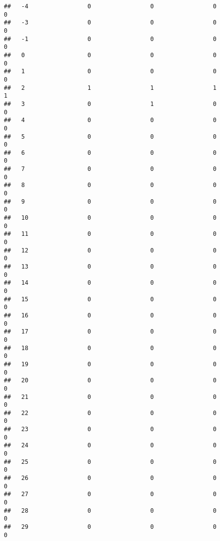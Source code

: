 \documentclass[]{article}
\begin{document}
\begin{verbatim}
##   -4                 0                 0                 0                 0
##   -3                 0                 0                 0                 0
##   -1                 0                 0                 0                 0
##   0                  0                 0                 0                 0
##   1                  0                 0                 0                 0
##   2                  1                 1                 1                 1
##   3                  0                 1                 0                 0
##   4                  0                 0                 0                 0
##   5                  0                 0                 0                 0
##   6                  0                 0                 0                 0
##   7                  0                 0                 0                 0
##   8                  0                 0                 0                 0
##   9                  0                 0                 0                 0
##   10                 0                 0                 0                 0
##   11                 0                 0                 0                 0
##   12                 0                 0                 0                 0
##   13                 0                 0                 0                 0
##   14                 0                 0                 0                 0
##   15                 0                 0                 0                 0
##   16                 0                 0                 0                 0
##   17                 0                 0                 0                 0
##   18                 0                 0                 0                 0
##   19                 0                 0                 0                 0
##   20                 0                 0                 0                 0
##   21                 0                 0                 0                 0
##   22                 0                 0                 0                 0
##   23                 0                 0                 0                 0
##   24                 0                 0                 0                 0
##   25                 0                 0                 0                 0
##   26                 0                 0                 0                 0
##   27                 0                 0                 0                 0
##   28                 0                 0                 0                 0
##   29                 0                 0                 0                 0

\end{verbatim}
\end{document}
